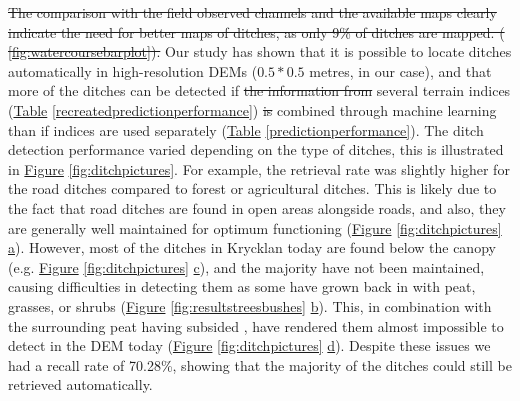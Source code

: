 \documentclass[11pt, review]{elsarticle} %
\providecommand{\DIFaddtex}[1]{{\protect\color{blue}\uwave{#1}}} %
\providecommand{\DIFdeltex}[1]{{\protect\color{red}\sout{#1}}}                      %
\providecommand{\DIFaddbegin}{} %
\providecommand{\DIFaddend}{} %
\providecommand{\DIFdelbegin}{} %
\providecommand{\DIFdelend}{} %
\providecommand{\DIFadd}[1]{\texorpdfstring{\DIFaddtex{#1}}{#1}} %
\providecommand{\DIFdel}[1]{\texorpdfstring{\DIFdeltex{#1}}{}} %
\begin{document}
\DIFdelbegin \DIFdel{The comparison with the field observed channels and the available maps clearly indicate the need for better maps of ditches, as only 9\% of ditches are mapped.  (}%
\DIFdel{\ref{fig:watercoursebarplot}). }\DIFdelend Our study has shown that it is possible to locate ditches automatically in high-resolution DEMs ($0.5  * 0.5 $ metres, in our case), and that more of the ditches can be detected if \DIFdelbegin \DIFdel{the information from }\DIFdelend several terrain indices (\hyperref[recreatedpredictionperformance]{Table} \ref{recreatedpredictionperformance}) \DIFdelbegin \DIFdel{is }\DIFdelend \DIFaddbegin \DIFadd{are }\DIFaddend combined through machine learning than if indices are used separately (\hyperref[predictionperformance]{Table} \ref{predictionperformance}).
The ditch detection performance varied depending on the type of ditches, this is illustrated in \hyperref[fig:ditchpictures]{Figure} \ref{fig:ditchpictures}. For example, the retrieval rate was slightly higher for the road ditches compared to forest or agricultural ditches. This is likely due to the fact that  road ditches are found in open areas alongside roads, and also,   they are generally well maintained for optimum functioning (\hyperref[fig:ditchpictures]{Figure} \ref{fig:ditchpictures} \hyperref[fig:ditchpictures]{a}). However, most of the ditches in Krycklan today are found below the canopy (e.g. \hyperref[fig:ditchpictures]{Figure} \ref{fig:ditchpictures} \hyperref[fig:ditchpictures]{c}), and the majority have not been maintained, causing difficulties in detecting them as some have grown back in with peat, grasses, or shrubs (\hyperref[fig:resultstreesbushes]{Figure} \ref{fig:resultstreesbushes} \hyperref[fig:resultstreesbushes]{b}). This, in combination with the surrounding peat having subsided \citep{heikurainen}, have rendered them almost impossible to detect in the DEM today (\hyperref[fig:ditchpictures]{Figure} \ref{fig:ditchpictures} \hyperref[fig:ditchpictures]{d}). Despite these issues we had a recall rate of 70.28\%, showing that the majority of the ditches could still be retrieved automatically.
\end{document}
